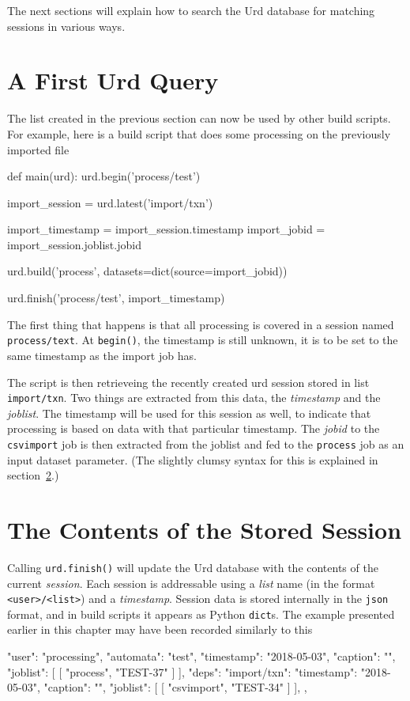 The next sections will explain how to search the Urd database for
matching sessions in various ways.




\section{A First Urd Query}

The list created in the previous section can now be used by other
build scripts.  For example, here is a build script that does some
processing on the previously imported file
\begin{python}
def main(urd):
    urd.begin('process/test')

    import_session = urd.latest('import/txn')

    import_timestamp = import_session.timestamp
    import_jobid     = import_session.joblist.jobid

    urd.build('process', datasets=dict(source=import_jobid))

    urd.finish('process/test', import_timestamp)
\end{python}
The first thing that happens is that all processing is covered in a
session named \texttt{process/text}.  At \texttt{begin()}, the
timestamp is still unknown, it is to be set to the same timestamp as
the import job has.

The script is then retrieveing the recently created urd session stored
in list \texttt{import/txn}.  Two things are extracted from this data,
the \textsl{timestamp} and the \textsl{joblist}.  The timestamp will
be used for this session as well, to indicate that processing is based
on data with that particular timestamp.  The \textsl{jobid} to
the \texttt{csvimport} job is then extracted from the joblist and fed
to the \texttt{process} job as an input dataset parameter.  (The
slightly clumsy syntax for this is explained in section~\ref{}.)



\section{The Contents of the Stored Session}

Calling \texttt{urd.finish()} will update the Urd database with the
contents of the current \textsl{session}.  Each session is addressable
using a \textsl{list} name (in the format \texttt{<user>/<list>}) and
a \textsl{timestamp}.  Session data is stored internally in
the \texttt{json} format, and in build scripts it appears as
Python \texttt{dict}s.  The example presented earlier in this chapter
may have been recorded similarly to this
\begin{json}
{
    "user": "processing",
    "automata": "test",
    "timestamp": "2018-05-03",
    "caption": "",
    "joblist": [
        [
            "process",
            "TEST-37"
        ]
    ],
    "deps": {
        "import/txn": {
            "timestamp": "2018-05-03",
            "caption": "",
            "joblist": [
                [
                    "csvimport",
                    "TEST-34"
                ]
            ],
        }
    },
}
\end{json}

